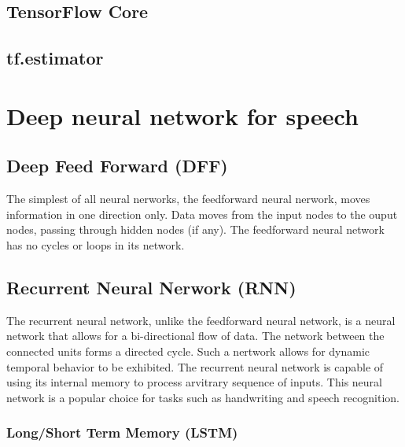 \subsection{TensorFlow Core}


\subsection{tf.estimator}


\section{Deep neural network for speech}

\subsection{Deep Feed Forward (DFF)}
The simplest of all neural nerworks, the feedforward neural nerwork, moves information in one direction only. Data moves from the input nodes to the ouput nodes, passing through hidden nodes (if any). The feedforward neural network has no cycles or loops in its network.

\subsection{Recurrent Neural Nerwork (RNN)}
The recurrent neural network, unlike the feedforward neural network, is a neural network that allows for a bi-directional flow of data. The network between the connected units forms a directed cycle. Such a nertwork allows for dynamic temporal behavior to be exhibited. The recurrent neural network is capable of using its internal memory to process arvitrary sequence of inputs. This neural network is a popular choice for tasks such as handwriting and speech recognition.

\subsubsection{Long/Short Term Memory (LSTM)}


